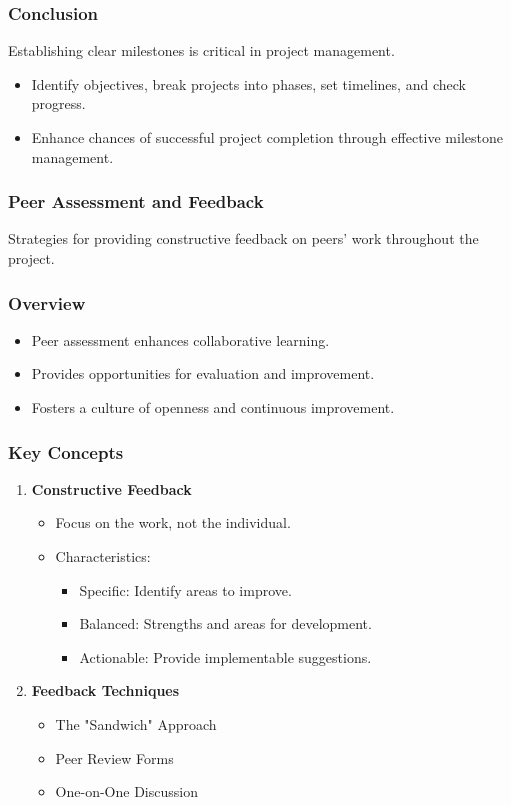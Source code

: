 \documentclass[aspectratio=169]{beamer}
\begin{document}
\begin{frame}[fragile]
    \frametitle{Conclusion}
    Establishing clear milestones is critical in project management. 
    \begin{itemize}
        \item Identify objectives, break projects into phases, set timelines, and check progress.
        \item Enhance chances of successful project completion through effective milestone management.
    \end{itemize}
\end{frame}

\begin{frame}[fragile]
    \frametitle{Peer Assessment and Feedback}
    Strategies for providing constructive feedback on peers' work throughout the project.
\end{frame}

\begin{frame}[fragile]
    \frametitle{Overview}
    \begin{itemize}
        \item Peer assessment enhances collaborative learning.
        \item Provides opportunities for evaluation and improvement.
        \item Fosters a culture of openness and continuous improvement.
    \end{itemize}
\end{frame}

\begin{frame}[fragile]
    \frametitle{Key Concepts}
    \begin{enumerate}
        \item \textbf{Constructive Feedback}
            \begin{itemize}
                \item Focus on the work, not the individual.
                \item Characteristics:
                    \begin{itemize}
                        \item Specific: Identify areas to improve.
                        \item Balanced: Strengths and areas for development.
                        \item Actionable: Provide implementable suggestions.
                    \end{itemize}
            \end{itemize}
        \item \textbf{Feedback Techniques}
            \begin{itemize}
                \item The "Sandwich" Approach
                \item Peer Review Forms
                \item One-on-One Discussion
            \end{itemize}
    \end{enumerate}
\end{frame}
\end{document}
